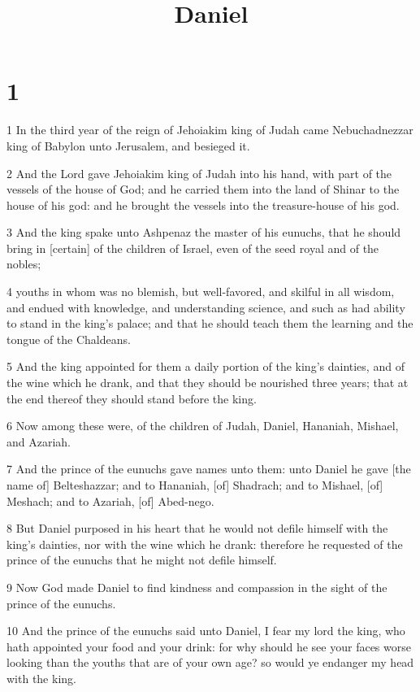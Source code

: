 

\title{Daniel}

\chapter{1}

\par 1 In the third year of the reign of Jehoiakim king of Judah came Nebuchadnezzar king of Babylon unto Jerusalem, and besieged it.
\par 2 And the Lord gave Jehoiakim king of Judah into his hand, with part of the vessels of the house of God; and he carried them into the land of Shinar to the house of his god: and he brought the vessels into the treasure-house of his god.
\par 3 And the king spake unto Ashpenaz the master of his eunuchs, that he should bring in [certain] of the children of Israel, even of the seed royal and of the nobles;
\par 4 youths in whom was no blemish, but well-favored, and skilful in all wisdom, and endued with knowledge, and understanding science, and such as had ability to stand in the king's palace; and that he should teach them the learning and the tongue of the Chaldeans.
\par 5 And the king appointed for them a daily portion of the king's dainties, and of the wine which he drank, and that they should be nourished three years; that at the end thereof they should stand before the king.
\par 6 Now among these were, of the children of Judah, Daniel, Hananiah, Mishael, and Azariah.
\par 7 And the prince of the eunuchs gave names unto them: unto Daniel he gave [the name of] Belteshazzar; and to Hananiah, [of] Shadrach; and to Mishael, [of] Meshach; and to Azariah, [of] Abed-nego.
\par 8 But Daniel purposed in his heart that he would not defile himself with the king's dainties, nor with the wine which he drank: therefore he requested of the prince of the eunuchs that he might not defile himself.
\par 9 Now God made Daniel to find kindness and compassion in the sight of the prince of the eunuchs.
\par 10 And the prince of the eunuchs said unto Daniel, I fear my lord the king, who hath appointed your food and your drink: for why should he see your faces worse looking than the youths that are of your own age? so would ye endanger my head with the king.
